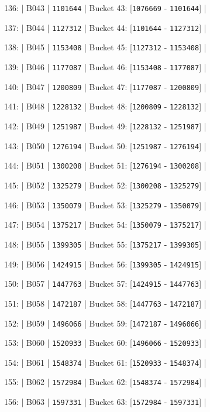 \documentclass[11pt,a4paper]{article}
\begin{document}
{{{136: | B043 | \texttt{1101644} | Bucket 43: [\texttt{1076669} - \texttt{1101644}] |

137: | B044 | \texttt{1127312} | Bucket 44: [\texttt{1101644} - \texttt{1127312}] |

138: | B045 | \texttt{1153408} | Bucket 45: [\texttt{1127312} - \texttt{1153408}] |

139: | B046 | \texttt{1177087} | Bucket 46: [\texttt{1153408} - \texttt{1177087}] |

140: | B047 | \texttt{1200809} | Bucket 47: [\texttt{1177087} - \texttt{1200809}] |

141: | B048 | \texttt{1228132} | Bucket 48: [\texttt{1200809} - \texttt{1228132}] |

142: | B049 | \texttt{1251987} | Bucket 49: [\texttt{1228132} - \texttt{1251987}] |

143: | B050 | \texttt{1276194} | Bucket 50: [\texttt{1251987} - \texttt{1276194}] |

144: | B051 | \texttt{1300208} | Bucket 51: [\texttt{1276194} - \texttt{1300208}] |

145: | B052 | \texttt{1325279} | Bucket 52: [\texttt{1300208} - \texttt{1325279}] |

146: | B053 | \texttt{1350079} | Bucket 53: [\texttt{1325279} - \texttt{1350079}] |

147: | B054 | \texttt{1375217} | Bucket 54: [\texttt{1350079} - \texttt{1375217}] |

148: | B055 | \texttt{1399305} | Bucket 55: [\texttt{1375217} - \texttt{1399305}] |

149: | B056 | \texttt{1424915} | Bucket 56: [\texttt{1399305} - \texttt{1424915}] |

150: | B057 | \texttt{1447763} | Bucket 57: [\texttt{1424915} - \texttt{1447763}] |

151: | B058 | \texttt{1472187} | Bucket 58: [\texttt{1447763} - \texttt{1472187}] |

152: | B059 | \texttt{1496066} | Bucket 59: [\texttt{1472187} - \texttt{1496066}] |

153: | B060 | \texttt{1520933} | Bucket 60: [\texttt{1496066} - \texttt{1520933}] |

154: | B061 | \texttt{1548374} | Bucket 61: [\texttt{1520933} - \texttt{1548374}] |

155: | B062 | \texttt{1572984} | Bucket 62: [\texttt{1548374} - \texttt{1572984}] |

156: | B063 | \texttt{1597331} | Bucket 63: [\texttt{1572984} - \texttt{1597331}] |

}}}
\end{document}
